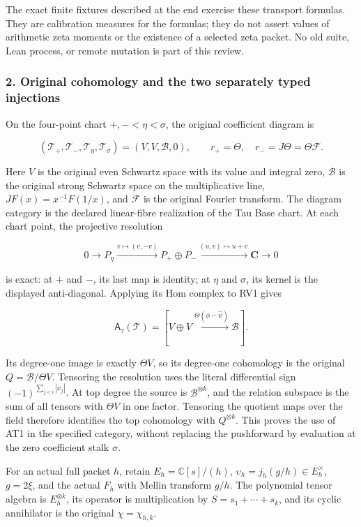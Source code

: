 The exact finite fixtures described at the end exercise these transport formulas. They are calibration measures for the formulas; they do not assert values of arithmetic zeta moments or the existence of a selected zeta packet. No old suite, Lean process, or remote mutation is part of this review.

\subsubsection{2. Original cohomology and the two separately typed injections}\label{endpoint-determinant_review--original-cohomology-and-the-two-separately-typed-injections}

On the four-point chart \(+,-<\eta<\sigma\), the original coefficient diagram is

\[
(\mathcal T_+,\mathcal T_-,\mathcal T_\eta,\mathcal T_\sigma)
=(V,V,\mathscr B,0),\qquad
r_+=\Theta,\quad r_-=J\Theta=\Theta\mathcal F.
\tag{RV1}
\]

Here \(V\) is the original even Schwartz space with its value and integral zero, \(\mathscr B\) is the original strong Schwartz space on the multiplicative line, \(JF(x)=x^{-1}F(1/x)\), and \(\mathcal F\) is the original Fourier transform. The diagram category is the declared linear-fibre realization of the Tau Base chart. At each chart point, the projective resolution

\[
0\to P_\eta\xrightarrow{v\mapsto(v,-v)}
P_+\oplus P_-\xrightarrow{(u,v)\mapsto u+v}\mathbf C\to0
\tag{RV2}
\]

is exact: at \(+\) and \(-\), its last map is identity; at \(\eta\) and \(\sigma\), its kernel is the displayed anti-diagonal. Applying its Hom complex to RV1 gives

\[
\mathsf A_\tau(\mathcal T)
=[V\oplus V\xrightarrow{\Theta(\phi-\widehat\psi)}\mathscr B].
\tag{RV3}
\]

Its degree-one image is exactly \(\Theta V\), so its degree-one cohomology is the original \(Q=\mathscr B/\Theta V\). Tensoring the resolution uses the literal differential sign \((-1)^{\sum_{j<i}|x_j|}\). At top degree the source is \(\mathscr B^{\otimes k}\), and the relation subspace is the sum of all tensors with \(\Theta V\) in one factor. Tensoring the quotient maps over the field therefore identifies the top cohomology with \(Q^{\otimes k}\). This proves the use of AT1 in the specified category, without replacing the pushforward by evaluation at the zero coefficient stalk \(\sigma\).

For an actual full packet \(h\), retain \(E_h=\mathbb C[s]/(h)\), \(\upsilon_h=j_h(g/h)\in E_h^\times\), \(g=2\xi\), and the actual \(F_h\) with Mellin transform \(g/h\). The polynomial tensor algebra is \(E_h^{\otimes k}\), its operator is multiplication by \(S=s_1+\cdots+s_k\), and its cyclic annihilator is the original \(\chi=\chi_{h,k}\).

